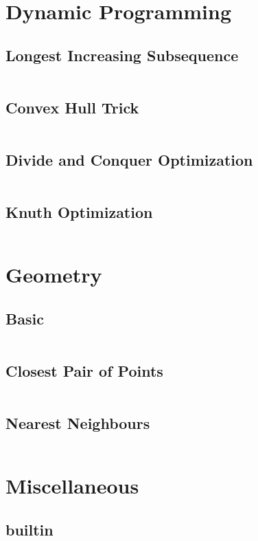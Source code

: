 \documentclass[a4paper, 10pt, twocolumn, landscape]{article}
\begin{document}
  \section{Dynamic Programming}
  \subsection{Longest Increasing Subsequence}
  \inputminted{cpp}{dynamic-programming/lis.cpp}
  \subsection{Convex Hull Trick}
  \inputminted{cpp}{dynamic-programming/convex-hull-trick.cpp}
  \subsection{Divide and Conquer Optimization}
  \inputminted{cpp}{dynamic-programming/divide-and-conquer-optimization.cpp}
  \subsection{Knuth Optimization}
  \inputminted{cpp}{dynamic-programming/knuth-optimization.cpp}

  \section{Geometry}
  \subsection{Basic}
  \inputminted{cpp}{geometry/basics.cpp}
  \subsection{Closest Pair of Points}
  \inputminted{cpp}{geometry/closest-pair.cpp}
  \subsection{Nearest Neighbours}
  \inputminted{cpp}{geometry/neighbour.cpp}

  \section{Miscellaneous}
  \subsection{builtin}
  \inputminted{cpp}{misc/builtin.cpp}
\end{document}
